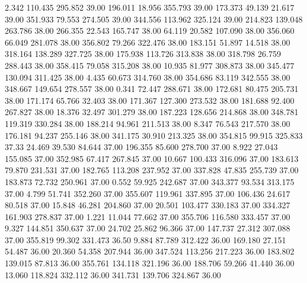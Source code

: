    2.342  110.435  295.852        39.00
 196.011   18.956  355.793        39.00
 173.373   49.139   21.617        39.00
 351.933   79.553  274.505        39.00
 344.556  113.962  325.124        39.00
 214.823  139.048  263.786        38.00
 266.355   22.543  165.747        38.00
  64.119   20.582  107.090        38.00
 356.060   66.049  281.078        38.00
 356.802   79.266  322.476        38.00
 183.151   51.897   14.518        38.00
 318.164  138.289  327.725        38.00
 175.938  113.726  313.838        38.00
 318.798   26.759  288.443        38.00
 358.415   79.058  315.208        38.00
  10.935   81.977  308.873        38.00
 345.477  130.094  311.425        38.00
   4.435   60.673  314.760        38.00
 354.686   83.119  342.555        38.00
 348.667  149.654  278.557        38.00
   0.341   72.447  288.671        38.00
 172.681   80.475  205.731        38.00
 171.174   65.766   32.403        38.00
 171.367  127.300  273.532        38.00
 181.688   92.400  267.827        38.00
  18.376   32.497  301.279        38.00
 187.223  128.656  214.868        38.00
 348.781  119.319  330.284        38.00
 188.214   94.961  211.513        38.00
   8.347   76.543  217.570        38.00
 176.181   94.237  255.146        38.00
 341.175   30.910  213.325        38.00
 354.815   99.915  325.833        37.33
  24.469   39.530   84.644        37.00
 196.355   85.600  278.700        37.00
   8.922   27.043  155.085        37.00
 352.985   67.417  267.845        37.00
  10.667  100.433  316.096        37.00
 183.613   79.870  231.531        37.00
 182.765  113.208  237.952        37.00
 337.828   47.835  255.739        37.00
 183.873   72.732  250.961        37.00
   0.552   59.925  242.687        37.00
 343.377   93.534  313.175        37.00
   4.799   51.741  352.260        37.00
 355.607  119.961  337.895        37.00
 106.436   24.617   80.518        37.00
  15.848   46.281  204.860        37.00
  20.501  103.477  330.183        37.00
 334.327  161.903  278.837        37.00
   1.221   11.044   77.662        37.00
 355.706  116.580  333.457        37.00
   9.327  144.851  350.637        37.00
  24.702   25.862   96.366        37.00
 147.737   27.312  307.088        37.00
 355.819   99.302  331.473        36.50
   9.884   87.789  312.422        36.00
 169.180   27.151   54.487        36.00
  20.360   54.358  207.944        36.00
 347.524  113.256  217.223        36.00
 183.802  139.015   87.813        36.00
 355.761  134.118  321.196        36.00
 188.706   59.266   41.440        36.00
  13.060  118.824  332.112        36.00
 341.731  139.706  324.867        36.00
